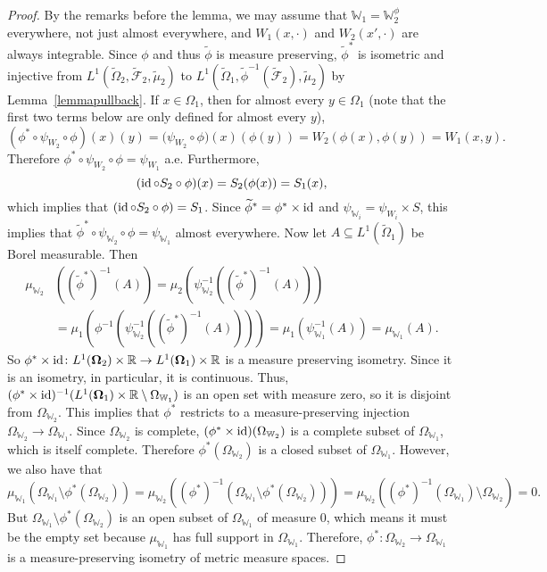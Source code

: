 \documentclass{amsart}
\numberwithin{equation}{section}
\numberwithin{figure}{section}
\theoremstyle{definition}
\theoremstyle{remark}
\newcommand{\id}{\mathop{\textup{id}}}
\newcommand{\bOmega}{{\mathbf{\Omega}}}
\newcommand{\wOmega}{{\widetilde{\Omega}}}
\newcommand{\wcF}{\widetilde{\mathcal{F}}}
\newcommand{\wmu}{\widetilde{\mu}}
\newcommand{\RR}{\mathbb{R}}
\newcommand{\cW}{\mathbb{W}}
\begin{document}
\begin{proof}
By the remarks before the lemma, we may assume that $\cW_1=\cW_2^\phi$
everywhere, not just almost everywhere, and $W_1(x,\cdot)$ and
$W_2(x',\cdot)$ are always integrable. Since $\phi$ and thus
$\widetilde{\phi}$ is measure preserving, $\widetilde{\phi}^*$ is isometric
and injective from $L^1(\wOmega_2,\wcF_2,\wmu_2)$ to
$L^1(\wOmega_1,\widetilde\phi^{-1}(\wcF_2),\wmu_2)$ by
Lemma~\ref{lemmapullback}. If $x \in \Omega_1$, then for almost every $y \in
\Omega_1$ (note that the first two terms below are only defined for almost
every $y$),
\[
(\phi^* \circ \psi_{W_2} \circ \phi)(x)(y)={(}\psi_{W_2} \circ \phi)(x)(\phi(y))=W_2(\phi(x),\phi(y))=W_1(x,y).
\]
Therefore $\phi^* \circ \psi_{W_2} \circ \phi=\psi_{W_1}$ a.e.
Furthermore,
\[(\id \circ S_2 \circ \phi)(x)=S_2(\phi(x))=S_1(x),
\]
which implies that $(\id \circ S_2 \circ \phi)=S_1$. Since
$\widetilde{\phi}^*=\phi^* \times \id$ and $\psi_{\cW_i}=\psi_{W_i} \times
S$, this implies that $\widetilde{\phi}^* \circ \psi_{\cW_2} \circ
\phi=\psi_{\cW_1}$ almost everywhere. Now let $A \subseteq L^1(\wOmega_1)$ be
Borel measurable. Then
\[
\begin{split}
\mu_{\cW_2}&((\widetilde{\phi}^*)^{-1}(A))=\mu_2(\psi_{\cW_2}^{-1}((\widetilde{\phi}^*)^{-1}(A)))\\
&=\mu_1(\phi^{-1}(\psi_{\cW_2}^{-1}((\widetilde{\phi}^*)^{-1}(A))))
=\mu_1(\psi_{\cW_1}^{-1}(A))
=\mu_{\cW_1}(A).
\end{split}
\]
So $\phi^* \times \id\colon L^1(\bOmega_2) \times \RR \rightarrow
L^1(\bOmega_1) \times \RR$ is a measure preserving isometry. Since it is an
isometry, in particular, it is continuous. Thus, $(\phi^* \times
\id)^{-1}(L^1(\bOmega_1) \times \RR \setminus \Omega_{\cW_1})$ is an open set
with measure zero, so it is disjoint from $\Omega_{\cW_2}$. This implies that
$\phi^*$ restricts to a measure-preserving injection $\Omega_{\cW_2}
\rightarrow\Omega_{\cW_1}$. Since $\Omega_{\cW_2}$ is complete, $(\phi^*
\times \id)(\Omega_{\cW_2})$ is a complete subset of $\Omega_{\cW_1}$, which
is itself complete. Therefore $\phi^*(\Omega_{\cW_2})$ is a closed subset of
$\Omega_{\cW_1}$. However, we also have that
\[
\mu_{\cW_1}(\Omega_{\cW_1} \setminus \phi^*(\Omega_{\cW_2}))=
\mu_{\cW_2}((\phi^*)^{-1}(\Omega_{\cW_1} \setminus \phi^*(\Omega_{\cW_2})))=
\mu_{\cW_2}((\phi^*)^{-1}(\Omega_{\cW_1}) \setminus \Omega_{\cW_2})=0.
\]
But $\Omega_{\cW_1} \setminus \phi^*(\Omega_{\cW_2})$ is an open subset of
$\Omega_{\cW_1}$ of measure $0$, which means it must be the empty set because
$\mu_{\cW_1}$ has full support in $\Omega_{\cW_1}$. Therefore, $\phi^*\colon
\Omega_{\cW_2} \rightarrow \Omega_{\cW_1}$ is a measure-preserving isometry
of metric measure spaces.


\end{proof}
\end{document}
